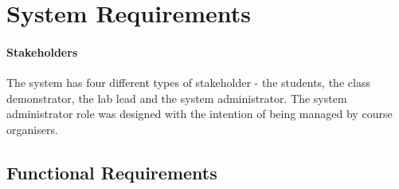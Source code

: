 \section{System Requirements}

\paragraph{Stakeholders} The system has four different types of stakeholder - the students, the class demonstrator, the lab lead and the system administrator. The system administrator role was designed with the intention of being managed by course organisers.

\subsection{Functional Requirements}


